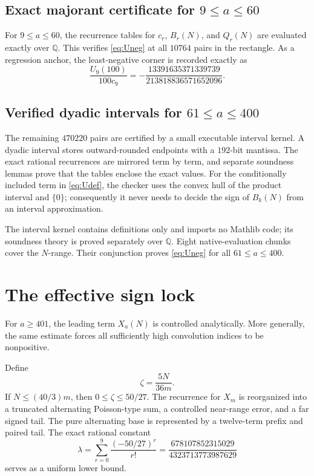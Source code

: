 \documentclass[11pt]{article}
\theoremstyle{definition}
\theoremstyle{remark}
\newcommand{\Q}{\mathbb Q}
\begin{document}
\subsection{Exact majorant certificate for \texorpdfstring{$9\le a\le60$}{9<=a<=60}}

For $9\le a\le60$, the recurrence tables for $c_r$, $B_r(N)$, and $Q_r(N)$
are evaluated exactly over $\Q$.  This verifies \eqref{eq:Uneg} at all
$10764$ pairs in the rectangle.  As a regression anchor, the least-negative
corner is recorded exactly as
\begin{equation}\label{eq:corner}
 \frac{U_9(100)}{100c_9}
 =-\frac{13391635371339739}{213818836571652096}.
\end{equation}

\subsection{Verified dyadic intervals for \texorpdfstring{$61\le a\le400$}{61<=a<=400}}

The remaining $470220$ pairs are certified by a small executable interval
kernel.  A dyadic interval stores outward-rounded endpoints with a $192$-bit
mantissa.  The exact rational recurrences are mirrored term by term, and
separate soundness lemmas prove that the tables enclose the exact values.
For the conditionally included term in \eqref{eq:Udef}, the checker uses the
convex hull of the product interval and $\{0\}$; consequently it never needs
to decide the sign of $B_k(N)$ from an interval approximation.

The interval kernel contains definitions only and imports no Mathlib code;
its soundness theory is proved separately over $\Q$.  Eight native-evaluation
chunks cover the $N$-range.  Their conjunction proves \eqref{eq:Uneg} for all
$61\le a\le400$.

\section{The effective sign lock}\label{sec:signlock}

For $a\ge401$, the leading term $X_a(N)$ is controlled analytically.  More
generally, the same estimate forces all sufficiently high convolution
indices to be nonpositive.

Define
\begin{equation}\label{eq:zeta}
  \zeta=\frac{5N}{36m}.
\end{equation}
If $N\le(40/3)m$, then $0\le\zeta\le50/27$.  The recurrence for $X_m$ is
reorganized into a truncated alternating Poisson-type sum, a controlled
near-range error, and a far signed tail.  The pure alternating base is
represented by a twelve-term prefix and paired tail.  The exact rational
constant
\begin{equation}\label{eq:lambda}
 \lambda=
 \sum_{r=0}^{9}\frac{(-50/27)^r}{r!}
 =\frac{678107852315029}{4323713773987629}
\end{equation}
serves as a uniform lower bound.
\end{document}
